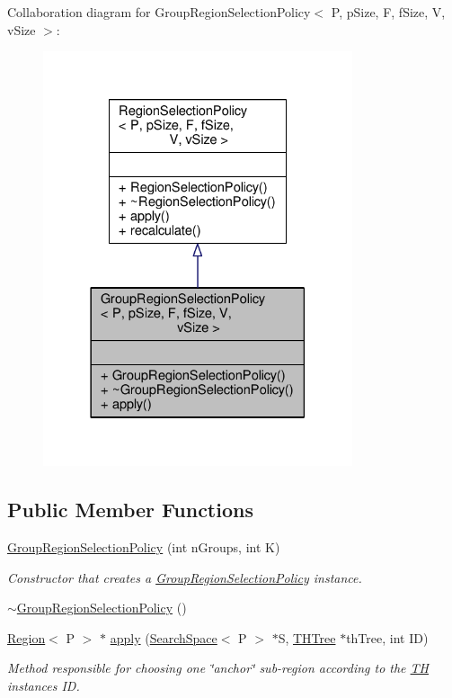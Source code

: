 Collaboration diagram for Group\+Region\+Selection\+Policy$<$ P, p\+Size, F, f\+Size, V, v\+Size $>$\+:
\nopagebreak
\begin{figure}[H]
\begin{center}
\leavevmode
\includegraphics[width=258pt]{classGroupRegionSelectionPolicy__coll__graph}
\end{center}
\end{figure}
\subsection*{Public Member Functions}
\begin{DoxyCompactItemize}
\item 
\hyperlink{classGroupRegionSelectionPolicy_aa4b4b59ce5231206f49b320e2aeb1cd6}{Group\+Region\+Selection\+Policy} (int n\+Groups, int K)
\begin{DoxyCompactList}\small\item\em Constructor that creates a \hyperlink{classGroupRegionSelectionPolicy}{Group\+Region\+Selection\+Policy} instance. \end{DoxyCompactList}\item 
\hyperlink{classGroupRegionSelectionPolicy_a0170690c1c49df4107b800e25e88918e}{$\sim$\+Group\+Region\+Selection\+Policy} ()
\item 
\hyperlink{classRegion}{Region}$<$ P $>$ $\ast$ \hyperlink{classGroupRegionSelectionPolicy_a28a39331dafaa273d30bef8f0da9e4fb}{apply} (\hyperlink{classSearchSpace}{Search\+Space}$<$ P $>$ $\ast$S, \hyperlink{classTHTree}{T\+H\+Tree} $\ast$th\+Tree, int ID)
\begin{DoxyCompactList}\small\item\em Method responsible for choosing one \char`\"{}anchor\char`\"{} sub-\/region according to the \hyperlink{classTH}{TH} instance\textquotesingle{}s ID. \end{DoxyCompactList}\end{DoxyCompactItemize}


